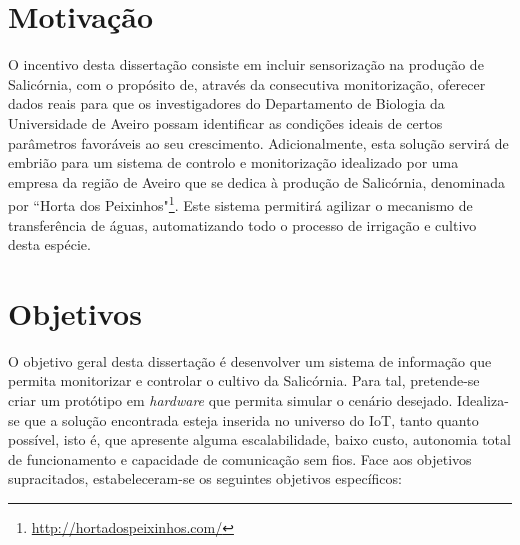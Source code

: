 \section{Motivação}

O incentivo desta dissertação consiste em incluir sensorização na produção de Salicórnia, com o propósito de, através da consecutiva monitorização, oferecer dados reais para que os investigadores do Departamento de Biologia da Universidade de Aveiro possam identificar as condições ideais de certos parâmetros favoráveis ao seu crescimento. Adicionalmente, esta solução servirá de embrião para um sistema de controlo e monitorização idealizado por uma empresa da região de Aveiro que se dedica à produção de Salicórnia, denominada por ``Horta dos Peixinhos"\footnote{\url{http://hortadospeixinhos.com/}}. Este sistema permitirá agilizar o mecanismo de transferência de águas, automatizando todo o processo de irrigação e cultivo desta espécie. 









\section{Objetivos}
\label{objectivos}



O objetivo geral desta dissertação é desenvolver um sistema de informação que permita monitorizar e controlar o cultivo da Salicórnia. Para tal, pretende-se criar um protótipo em \textit{hardware} que permita  simular o cenário desejado. Idealiza-se que a solução encontrada esteja inserida no universo do \ac{IoT}\cite{Farooq2015}, tanto quanto possível, isto é, que apresente alguma escalabilidade, baixo custo, autonomia total de funcionamento e capacidade de comunicação sem fios. Face aos objetivos supracitados, estabeleceram-se os seguintes objetivos específicos:




